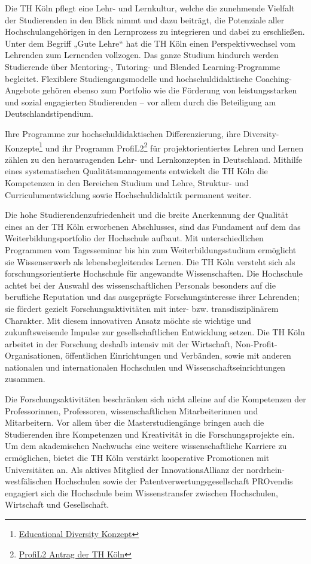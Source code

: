 Die TH Köln pflegt eine Lehr- und Lernkultur, welche die zunehmende
Vielfalt der Studierenden in den Blick nimmt und dazu beiträgt, die
Potenziale aller Hochschulangehörigen in den Lernprozess zu integrieren
und dabei zu erschließen. Unter dem Begriff „Gute Lehre`` hat die TH
Köln einen Perspektivwechsel vom Lehrenden zum Lernenden vollzogen. Das
ganze Studium hindurch werden Studierende über Mentoring-, Tutoring- und
Blended Learning-Programme begleitet. Flexiblere Studiengangsmodelle und
hochschuldidaktische Coaching-Angebote gehören ebenso zum Portfolio wie
die Förderung von leistungsstarken und sozial engagierten Studierenden
-- vor allem durch die Beteiligung am Deutschlandstipendium.

Ihre Programme zur hochschuldidaktischen Differenzierung, ihre
Diversity-Konzepte\footnote{\href{https://www.th-koeln.de/hochschule/educational-diversity_5710.php}{Educational
  Diversity Konzept}} und ihr Programm ProfiL2\footnote{\href{https://www.th-koeln.de/mam/downloads/deutsch/hochschule/profil/lehre/profil2_antrag_ministerium.pdf}{ProfiL2
  Antrag der TH Köln}} für projektorientiertes Lehren und Lernen zählen
zu den herausragenden Lehr- und Lernkonzepten in Deutschland. Mithilfe
eines systematischen Qualitätsmanagements entwickelt die TH Köln die
Kompetenzen in den Bereichen Studium und Lehre, Struktur- und
Curriculumentwicklung sowie Hochschuldidaktik permanent weiter.

Die hohe Studierendenzufriedenheit und die breite Anerkennung der
Qualität eines an der TH Köln erworbenen Abschlusses, sind das Fundament
auf dem das Weiterbildungsportfolio der Hochschule aufbaut. Mit
unterschiedlichen Programmen vom Tagesseminar bis hin zum
Weiterbildungsstudium ermöglicht sie Wissenserwerb als
lebensbegleitendes Lernen. Die TH Köln versteht sich als
forschungsorientierte Hochschule für angewandte Wissenschaften. Die
Hochschule achtet bei der Auswahl des wissenschaftlichen Personals
besonders auf die berufliche Reputation und das ausgeprägte
Forschungsinteresse ihrer Lehrenden; sie fördert gezielt
Forschungsaktivitäten mit inter- bzw. transdisziplinärem Charakter. Mit
diesem innovativen Ansatz möchte sie wichtige und zukunftsweisende
Impulse zur gesellschaftlichen Entwicklung setzen. Die TH Köln arbeitet
in der Forschung deshalb intensiv mit der Wirtschaft,
Non-Profit-Organisationen, öffentlichen Einrichtungen und Verbänden,
sowie mit anderen nationalen und internationalen Hochschulen und
Wissenschaftseinrichtungen zusammen.

Die Forschungsaktivitäten beschränken sich nicht alleine auf die
Kompetenzen der Professorinnen, Professoren, wissenschaftlichen
Mitarbeiterinnen und Mitarbeitern. Vor allem über die Masterstudiengänge
bringen auch die Studierenden ihre Kompetenzen und Kreativität in die
Forschungsprojekte ein. Um dem akademischen Nachwuchs eine weitere
wissenschaftliche Karriere zu ermöglichen, bietet die TH Köln verstärkt
kooperative Promotionen mit Universitäten an. Als aktives Mitglied der
InnovationsAllianz der nordrhein-westfälischen Hochschulen sowie der
Patentverwertungsgesellschaft PROvendis engagiert sich die Hochschule
beim Wissenstransfer zwischen Hochschulen, Wirtschaft und Gesellschaft.

